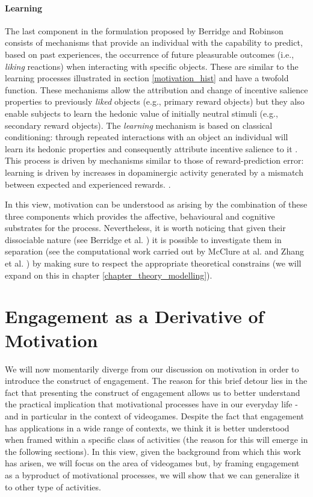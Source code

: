 \paragraph*{Learning}
\label{learning}
The last component in the formulation proposed by Berridge and Robinson \cite{berridge1998role,berridge2004motivation} consists of mechanisms that provide an individual with the capability to predict, based on past experiences, the occurrence of future pleasurable outcomes (i.e., \emph{liking} reactions) when interacting with specific objects. These are similar to the learning processes illustrated in section \ref{motivation_hist} and have a twofold function. These mechanisms allow the attribution and change of incentive salience properties to previously \emph{liked} objects (e.g., primary reward objects) but they also enable subjects to learn the hedonic value of initially neutral stimuli (e.g., secondary reward objects). The \emph{learning} mechanism is based on classical conditioning: through repeated interactions with an object an individual will learn its hedonic properties and consequently attribute incentive salience to it \cite{berridge2004motivation,berridge2009dissecting}. This process is driven by mechanisms similar to those of reward-prediction error: learning is driven by increases in dopaminergic activity generated by a mismatch between expected and experienced rewards. \cite{schultz1997neural,schultz2000multiple,flagel2011selective}.

In this view, motivation can be understood as arising by the combination of these three components \cite{berridge1998role, berridge2004motivation, berridge2008affective} which provides the affective, behavioural and cognitive substrates for the process. Nevertheless, it is worth noticing that given their dissociable nature (see Berridge et al. \cite{berridge2009dissecting}) it is possible to  investigate them in separation (see the computational work carried out by McClure at al. \cite{mcclure2003computational} and Zhang et al. \cite{zhang2009neural}) by making sure to respect the appropriate theoretical constrains (we will expand on this in chapter \ref{chapter_theory_modelling}).

\section{Engagement as a Derivative of Motivation}
\label{engagement}
We will now momentarily diverge from our discussion on motivation in order to introduce the construct of engagement. The reason for this brief detour lies in the fact that presenting the construct of engagement allows us to better understand the practical implication that motivational processes have in our everyday life - and in particular in the context of videogames. Despite the fact that engagement has applications in a wide range of contexts, we think it is better understood when framed within a specific class of activities (the reason for this will emerge in the following sections). In this view, given the background from which this work has arisen, we will focus on the area of videogames but, by framing engagement as a byproduct of motivational processes, we will show that we can generalize it to other type of activities.

